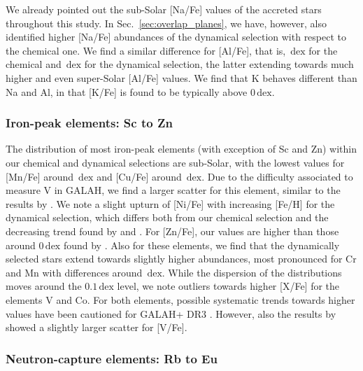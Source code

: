 \documentclass[fleqn,usenatbib]{mnras}
\newcommand{\dex}{\,\mathrm{dex}}	%
\begin{document}
We already pointed out the sub-Solar [Na/Fe] values of the accreted stars throughout this study. In Sec.~\ref{sec:overlap_planes}, we have, however, also identified higher [Na/Fe] abundances of the dynamical selection with respect to the chemical one. We find a similar difference for [Al/Fe], that is, $\dex$ for the chemical and $\dex$ for the dynamical selection, the latter extending towards much higher and even super-Solar [Al/Fe] values. We find that K behaves different than Na and Al, in that [K/Fe] is found to be typically above $0\dex$.

\subsubsection{Iron-peak elements: Sc to Zn} \label{sec:chronochemodynamics_ironpeak}

The distribution of most iron-peak elements (with exception of Sc and Zn) within our chemical and dynamical selections are sub-Solar, with the lowest values for [Mn/Fe] around $\dex$ and [Cu/Fe] around $\dex$. Due to the difficulty associated to measure V in GALAH, we find a larger scatter for this element, similar to the results by \citep{Hawkins2015}. We note a slight upturn of [Ni/Fe] with increasing [Fe/H] for the dynamical selection, which differs both from our chemical selection and the decreasing trend found by \citet{Nissen2010} and \citet{Hawkins2015}. For [Zn/Fe], our values are higher than those around $0\dex$ found by \citet{Nissen2011}. Also for these elements, we find that the dynamically selected stars extend towards slightly higher abundances, most pronounced for Cr and Mn with differences around $\dex$. While the dispersion of the distributions moves around the $0.1\dex$ level, we note outliers towards higher [X/Fe] for the elements V and Co. For both elements, possible systematic trends towards higher values have been cautioned for GALAH+ DR3 \citep{Buder2021}. However, also the results by \citet{Hawkins2015} showed a slightly larger scatter for [V/Fe].

\subsubsection{Neutron-capture elements: Rb to Eu}
\end{document}
